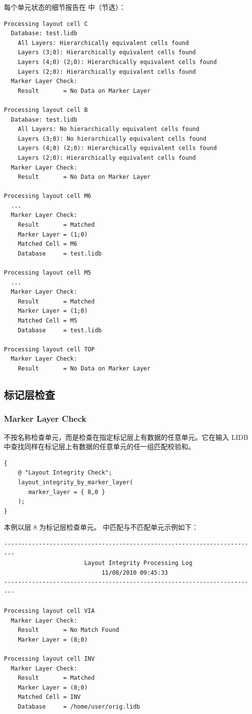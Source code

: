 每个单元状态的细节报告在  中（节选）：

\begin{lstlisting}
Processing layout cell C
  Database: test.lidb
    All Layers: Hierarchically equivalent cells found
    Layers (3;0): Hierarchically equivalent cells found
    Layers (4;0) (2;0): Hierarchically equivalent cells found
    Layers (2;0): Hierarchically equivalent cells found
  Marker Layer Check:
    Result       = No Data on Marker Layer

Processing layout cell B
  Database: test.lidb
    All Layers: No hierarchically equivalent cells found
    Layers (3;0): No hierarchically equivalent cells found
    Layers (4;0) (2;0): Hierarchically equivalent cells found
    Layers (2;0): Hierarchically equivalent cells found
  Marker Layer Check:
    Result       = No Data on Marker Layer

Processing layout cell M6
  ...
  Marker Layer Check:
    Result       = Matched
    Marker Layer = (1;0)
    Matched Cell = M6
    Database     = test.lidb

Processing layout cell M5
  ...
  Marker Layer Check:
    Result       = Matched
    Marker Layer = (1;0)
    Matched Cell = M5
    Database     = test.lidb

Processing layout cell TOP
  Marker Layer Check:
    Result       = No Data on Marker Layer
\end{lstlisting}

\subsection{标记层检查}
\subsubsection*{Marker Layer Check}

 不按名称检查单元，而是检查在指定标记层上有数据的任意单元。它在输入 LIDB 中查找同样在标记层上有数据的任意单元的任一组匹配校验和。

\begin{lstlisting}[style=pxl]
{
    @ "Layout Integrity Check";
    layout_integrity_by_marker_layer(
       marker_layer = { 8,0 }
    );
}
\end{lstlisting}

本例以层 8 为标记层检查单元。 中匹配与不匹配单元示例如下：

\begin{lstlisting}
-------------------------------------------------------------------------
                       Layout Integrity Processing Log
                            11/08/2010 09:45:33
-------------------------------------------------------------------------

Processing layout cell VIA
  Marker Layer Check:
    Result       = No Match Found
    Marker Layer = (8;0)

Processing layout cell INV
  Marker Layer Check:
    Result       = Matched
    Marker Layer = (8;0)
    Matched Cell = INV
    Database     = /home/user/orig.lidb
\end{lstlisting}

